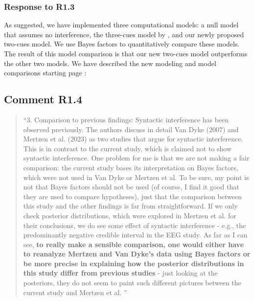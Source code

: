 \documentclass[12pt]{article}
\begin{document}
\subsubsection*{Response to R1.3}
As suggested, we have implemented three computational models: a null model that assumes no interference, the three-cues model by \textcite{mertzen}, and our newly proposed two-cues model. We use Bayes factors to quantitatively compare these models. The result of this model comparison is that our new two-cues model outperforms the other two models. We have described the new modeling and model comparisons starting page \pageref{modeling}:

\begin{quote}
\end{quote}
\newpage

\subsection*{Comment R1.4}
\begin{quote}
``3. Comparison to previous findings: Syntactic interference has been observed previously. The authors discuss in detail Van Dyke (2007) and Mertzen et al. (2023) as two studies that argue for syntactic interference. This is in contrast to the current study, which is claimed not to show syntactic interference. One problem for me is that we are not making a fair comparison: the current study bases its interpretation on Bayes factors, which were not used in Van Dyke or Mertzen et al. To be sure, my point is not that Bayes factors should not be used (of course, I find it good that they are used to compare hypotheses), just that the comparison between this study and the other findings is far from straightforward. If we only check posterior distributions, which were explored in Mertzen et al. for their conclusions, we do see some effect of syntactic interference - e.g., the predominantly negative credible interval in the EEG study. As far as I can see, \textbf{to really make a sensible comparison, one would either have to reanalyze Mertzen and Van Dyke's data using Bayes factors or be more precise in explaining how the posterior distributions in this study differ from previous studies} - just looking at the posteriors, they do not seem to paint such different pictures between the current study and Mertzen et al. ''\end{quote}
\end{document}
